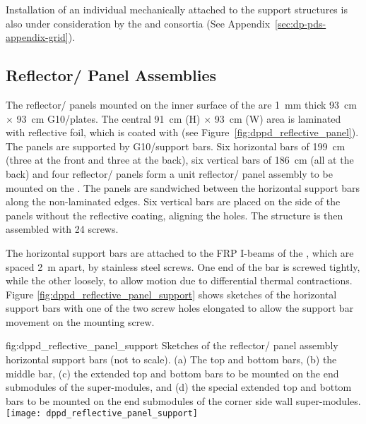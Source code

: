 Installation of an individual  mechanically attached to the  support structures is also under consideration by the  and   consortia (See Appendix~\ref{sec:dp-pds-appendix-grid}).


\subsection{Reflector/ Panel Assemblies}
\label{subsec:dp-pds-mechanics-reflectors}

The reflector/ panels mounted on the inner surface of the  are \SI{1}{\mm} thick \SI{93}{\cm} $\times$ \SI{93}{\cm} G10/\frfour plates. The central \SI{91}{\cm} (H) $\times$ \SI{93}{\cm} (W) area is laminated with reflective foil, which is coated with  (see Figure~\ref{fig:dppd_reflective_panel}). The panels are supported by G10/\frfour support bars. Six horizontal bars of \SI{199}{\cm} (three at the front and three at the back), six vertical bars of \SI{186}{\cm} (all at the back) and four reflector/ panels form a unit reflector/ panel assembly to be mounted on the . The panels are sandwiched between the horizontal support bars along the non-laminated edges. Six vertical bars are placed on the side of the panels without the reflective coating, aligning the holes. The structure is then  assembled %
with \num{24} screws.

The horizontal support bars are attached to the FRP I-beams of the , which are spaced \SI{2}{\m} apart, by stainless steel screws. One end of the bar is screwed tightly, while the other loosely, to allow motion due to differential thermal contractions. Figure \ref{fig:dppd_reflective_panel_support} shows sketches of the horizontal support bars with one of the two screw holes elongated to allow the support bar movement on the mounting screw.

\begin{dunefigure}{fig:dppd_reflective_panel_support}
{Sketches of the reflector/ panel assembly horizontal support bars (not to scale). (a) The top and bottom bars, (b) the middle bar, (c) the extended top and bottom bars to be mounted on the end submodules of the  super-modules, and (d) the special extended top and bottom bars to be mounted on the end submodules of the corner  side wall super-modules.}
\texttt{[image: dppd\_reflective\_panel\_support]}
\end{dunefigure}

